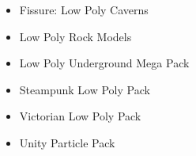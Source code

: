 

\begin{itemize}  
    \item Fissure: Low Poly Caverns \cite{noauthor_fissure_nodate}
    \item Low Poly Rock Models \cite{noauthor_low_lprm}
    \item Low Poly Underground Mega Pack \cite{noauthor_low_nodate}
    \item Steampunk Low Poly Pack \cite{noauthor_steampunk_lp}
    \item Victorian Low Poly Pack \cite{noauthor_victorian_nodate}
    \item Unity Particle Pack \cite{noauthor_unity_nodate}
\end{itemize}


